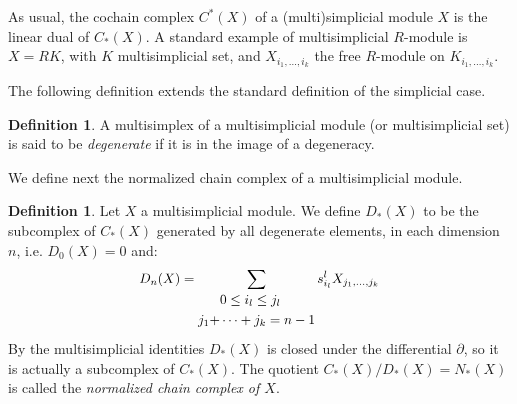 \documentclass[a4paper,11pt]{article}
\theoremstyle{remark}
\theoremstyle{definition}
\newtheorem{definition}[theorem]{Definition}
\begin{document}
As usual, the cochain complex $C^*(X)$ of a (multi)simplicial module $X$ is the linear dual of $C_*(X)$.  
A standard example of multisimplicial $R$-module is $X=RK$, with $K$ multisimplicial set, and $X_{i_1,\dots,i_k}$ the free $R$-module
on $K_{i_1,\dots,i_k}$.

The following definition extends the standard definition of the simplicial case.
\begin{definition}
A multisimplex of a multisimplicial module (or multisimplicial set)  is said to be {\em degenerate} if it is in the image of a degeneracy.
\end{definition}





We define next the normalized chain complex of a multisimplicial module.

\begin{definition}
Let $X$ a multisimplicial module. We define $D_{*}(X)$ to be the subcomplex of $C_{*}(X)$ generated by all degenerate elements, in each dimension $n$, i.e. $D_{0}(X)=0$ and:
	\begin{equation*}
	\resizebox{0.5\hsize}{!}{$%
	\begin{split}
    D_{n}(X)= 
    \sum_{\begin{split}
    	& 0 \leq i_l \leq j_l \\
    	j_{1}+&\dots +j_{k}=n-1 \\
    	\end{split}} 
    s_{i_l}^{l}X_{j_{1},\dots,j_{k}} \\
	\end{split}
    $%
    }%
	\end{equation*}
By the multisimplicial identities $D_{*}(X)$ is closed under the differential $\partial$, so it is actually a subcomplex of $C_*(X)$.
 The quotient $C_{*}(X)/ D_{*}(X) = N_*(X)$  is called the \textit{normalized chain complex of $X$}.
\end{definition}
\end{document}
